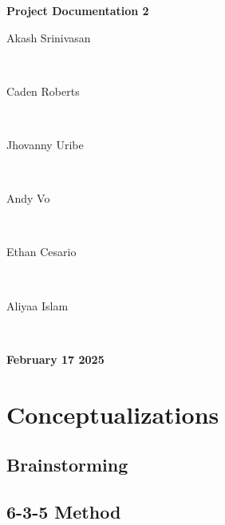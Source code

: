 \documentclass{article}
\begin{document}
\begin{titlepage}
    \centering
    \vfill
    {\Huge \bfseries Project Documentation 2\par}
    \vspace{1.5cm}
    {\Huge
        Akash Srinivasan \par \ \par
        Caden Roberts \par \ \par
        Jhovanny Uribe \par \ \par
        Andy Vo \par \ \par
        Ethan Cesario \par \ \par
        Aliyaa Islam \par \ \par
    }
    \vspace{1.5cm}
    {\Huge \bfseries February 17 2025\par}
\end{titlepage}
\section{Conceptualizations}
\subsection{Brainstorming}

\subsection{6-3-5 Method}

\end{document}
